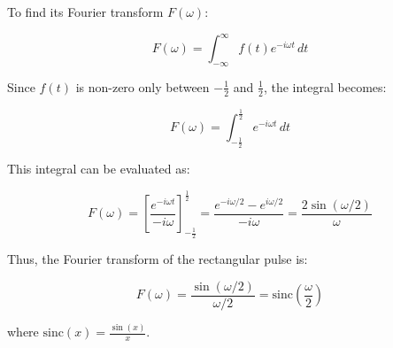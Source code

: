 To find its Fourier transform \( F(\omega) \):

\[ F(\omega) = \int_{-\infty}^{\infty} f(t) e^{-i \omega t} \, dt \]

Since \( f(t) \) is non-zero only between \( -\frac{1}{2} \) and \( \frac{1}{2} \), the integral becomes:

\[ F(\omega) = \int_{-\frac{1}{2}}^{\frac{1}{2}} e^{-i \omega t} \, dt \]

This integral can be evaluated as:

\[ F(\omega) = \left[ \frac{e^{-i \omega t}}{-i \omega} \right]_{-\frac{1}{2}}^{\frac{1}{2}} = \frac{e^{-i \omega / 2} - e^{i \omega / 2}}{-i \omega} = \frac{2 \sin(\omega / 2)}{\omega} \]

Thus, the Fourier transform of the rectangular pulse is:

\[ F(\omega) = \frac{\sin(\omega / 2)}{\omega / 2} = \text{sinc}\left(\frac{\omega}{2}\right) \]

where \(\text{sinc}(x) = \frac{\sin(x)}{x}\).








